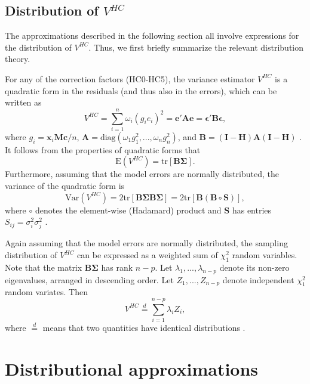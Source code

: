 \documentclass[12pt]{article}\usepackage[]{graphicx}\usepackage[]{color}
\newcommand{\E}{\text{E}}
\newcommand{\Var}{\text{Var}}
\newcommand{\tr}{\text{tr}}
\newcommand{\diag}{\text{diag}}
\newcommand{\bm}{\mathbf}
\newcommand{\bs}{\boldsymbol}
\begin{document}
\subsection{Distribution of $V^{HC}$}
\label{subsec:distribution_theory}

The approximations described in the following section all involve expressions for the distribution of $V^{HC}$. Thus, we first briefly summarize the relevant distribution theory. 

For any of the correction factors (HC0-HC5), the variance estimator $V^{HC}$ is a quadratic form in the residuals (and thus also in the errors), which can be written as 
\[
V^{HC} = \sum_{i=1}^n \omega_i \left(g_i e_i\right)^2 = \bm{e}' \bm{A} \bm{e} = \bs\epsilon' \bm{B} \bs\epsilon , \]
where $g_i = \bm{x}_i \bm{M} \bm{c} / n$, $\bm{A} = \diag\left(\omega_1 g_1^2,...,\omega_n g_n^2\right)$, and $\bm{B} = \left(\bm{I} - \bm{H}\right)\bm{A}\left(\bm{I} - \bm{H}\right)$ \citep{Bell2002bias, Cribari-Neto2011new}. 
It follows from the properties of quadratic forms that 
\begin{equation}
\label{eq:V_expectation}
\E\left(V^{HC}\right) = \tr\left[\bm{B}\bs\Sigma\right]. 
\end{equation}
Furthermore, assuming that the model errors are normally distributed, the variance of the quadratic form is
\begin{equation}
\label{eq:V_variance}
\Var\left(V^{HC}\right) = 2\tr\left[\bm{B} \bs\Sigma \bm{B} \bs\Sigma\right] = 2\tr\left[\bm{B} \left(\bm{B} \circ \bm{S}\right)\right], 
\end{equation}
where $\circ$ denotes the element-wise (Hadamard) product and $\bm{S}$ has entries $S_{ij} = \sigma_i^2 \sigma_j^2$ \citep{Lipsitz1999degrees}. 

Again assuming that the model errors are normally distributed, the sampling distribution of $V^{HC}$ can be expressed as a weighted sum of $\chi^2_1$ random variables. 
Note that the matrix $\bm{B}\bs\Sigma$ has rank $n - p$. 
Let $\lambda_1,...,\lambda_{n - p}$ denote its non-zero eigenvalues, arranged in descending order. 
Let $Z_1,...,Z_{n-p}$ denote independent $\chi^2_1$ random variates. 
Then 
\begin{equation}
\label{eq:weighted_sum_chi_sq}
V^{HC} \stackrel{d}{=} \sum_{i=1}^{n-p} \lambda_i Z_i,
\end{equation}
where $\stackrel{d}{=}$ means that two quantities have identical distributions \citep[][Eq. 4.1.1]{mathai1992quadratic}.

\section{Distributional approximations}
\label{sec:approximations}
\end{document}

